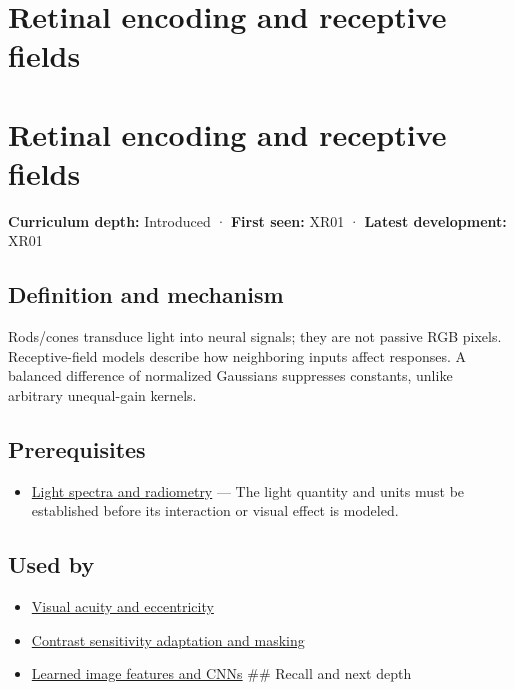 \hypertarget{appendix-7281c15ac44a}{}
\section*{Retinal encoding and receptive fields}
\section{Retinal encoding and receptive fields}\label{retinal-encoding-and-receptive-fields}

\textbf{Curriculum depth:} Introduced · \textbf{First seen:} XR01 · \textbf{Latest development:} XR01

\subsection{Definition and mechanism}\label{definition-and-mechanism}

Rods/cones transduce light into neural signals; they are not passive RGB pixels. Receptive-field models describe how neighboring inputs affect responses. A balanced difference of normalized Gaussians suppresses constants, unlike arbitrary unequal-gain kernels.

\subsection{Prerequisites}\label{prerequisites}

\begin{itemize}
\tightlist
\item
  \hyperref[appendix-215c2570199b]{Light spectra and radiometry} --- The light quantity and units must be established before its interaction or visual effect is modeled.
\end{itemize}

\subsection{Used by}\label{used-by}

\begin{itemize}
\item
  \hyperref[appendix-b491fc48c54b]{Visual acuity and eccentricity}
\item
  \hyperref[appendix-b3aa9e8e01ad]{Contrast sensitivity adaptation and masking}
\item
  \hyperref[appendix-47c51ea026fb]{Learned image features and CNNs} \#\# Recall and next depth
\end{itemize}

